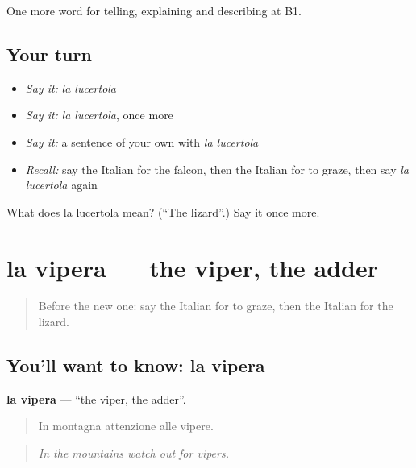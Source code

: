 \begin{grammarlens}[title={What you've built}]
One more word for telling, explaining and describing at B1.
\end{grammarlens}

\subsection*{Your turn}
\begin{itemize}
\raggedright
  \item \emph{Say it:} \emph{la lucertola}
  \item \emph{Say it:} \emph{la lucertola}, once more
  \item \emph{Say it:} a sentence of your own with \emph{la lucertola}
  \item \emph{Recall:} say the Italian for the falcon, then the Italian for to graze, then say \emph{la lucertola} again
\end{itemize}

\begin{tcolorbox}[breakable,colback=teal!4,colframe=teal!35!black,title={Before you move on}]
What does la lucertola mean? (\textquotedblleft{}The lizard\textquotedblright{}.) Say it once more.
\end{tcolorbox}
\section[la vipera]{la vipera — the viper, the adder}

\label{lesson:IT-C465-vipera}



\begin{quote}
Before the new one: say the Italian for to graze, then the Italian for the lizard.
\end{quote}

\subsection*{You'll want to know: la vipera}
\textbf{la vipera} — \textquotedblleft{}the viper, the adder\textquotedblright{}.

\begin{quote}
In montagna attenzione alle vipere.
\end{quote}

\begin{quote}
\emph{In the mountains watch out for vipers.}
\end{quote}


